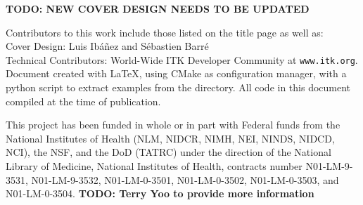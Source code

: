 
\begin{minipage}[t][2.7cm][b]{\textwidth}
\begin{center}

\bf{TODO:  NEW COVER DESIGN NEEDS TO BE UPDATED}

Contributors to this work include those listed on the title page as well
as:\\ Cover Design: Luis Ib\'{a}\~{n}ez and S\'{e}bastien Barr\'{e}\\
Technical Contributors: World-Wide ITK Developer Community at
\texttt{www.itk.org}. \\Document created with \LaTeX{}, using CMake as
configuration manager, with a python script to extract examples from the
 directory. All code in this document compiled at
the time of publication.
\end{center}
\end{minipage}


\begin{minipage}[t][2.5cm][b]{\textwidth}
\begin{center}
This project has been funded in whole or in part with Federal funds from the
National Institutes of Health (NLM, NIDCR, NIMH, NEI, NINDS, NIDCD, NCI), the
NSF, and the DoD (TATRC) under the direction of the National Library of
Medicine, National Institutes of Health, contracts number N01-LM-9-3531,
N01-LM-9-3532, N01-LM-0-3501, N01-LM-0-3502, N01-LM-0-3503, and
N01-LM-0-3504.  \bf{TODO:  Terry Yoo to provide more information}
\end{center}
\end{minipage}


